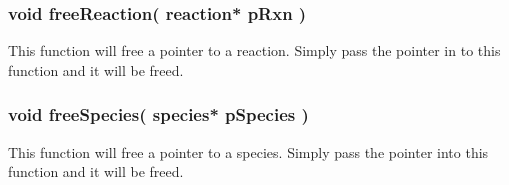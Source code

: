 \subsubsection{void freeReaction( reaction* pRxn )}
This function will free a pointer to a reaction.  Simply pass the
pointer in to this function and it will be freed.

\subsubsection{void freeSpecies( species* pSpecies )}
This function will free a pointer to a species.  Simply pass the
pointer into this function and it will be freed.
